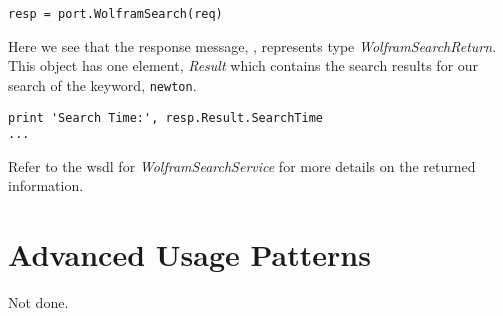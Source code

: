 \begin{verbatim}
resp = port.WolframSearch(req)
\end{verbatim}

Here we see that the response message, , represents type {\it WolframSearchReturn}.
This object has one element, {\it Result} which contains the search results for our
search of the keyword, {\tt newton}.

\begin{verbatim}
print 'Search Time:', resp.Result.SearchTime
...
\end{verbatim}

Refer to the wsdl for {\it WolframSearchService} for more details on the returned information.


\section{Advanced Usage Patterns}
\label{section:AUP}
Not done.


